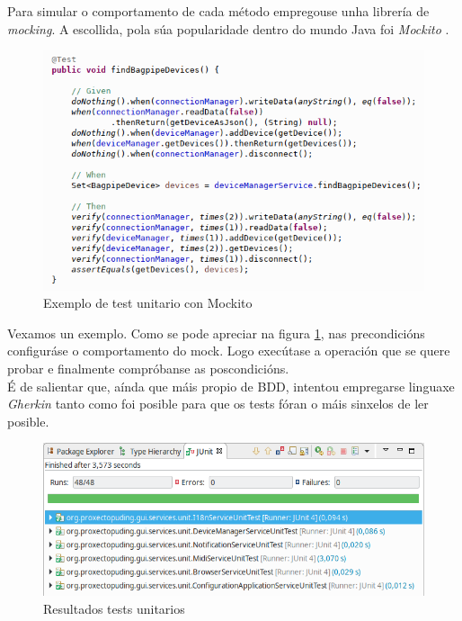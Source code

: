   Para simular o comportamento de cada método empregouse unha librería de
  \textit{mocking}. A escollida, pola súa popularidade dentro do mundo Java foi
  \textit{Mockito} \cite{Mockito}. \\
  
  \begin{figure}[htbp]
   \centering
   \includegraphics[scale=0.8,keepaspectratio=true]{./imagenes/test-mockito.png}
   \caption{Exemplo de test unitario con Mockito}
   \label{figura:TestMockito}
  \end{figure}
  
  Vexamos un exemplo. Como se pode apreciar na figura \ref{figura:TestMockito},
  nas precondicións configuráse o comportamento do mock. Logo execútase a
  operación que se quere probar e finalmente compróbanse as poscondicións. \\
  
  É de salientar que, aínda que máis propio de BDD, intentou empregarse linguaxe
  \textit{Gherkin} \cite{Gherkin} tanto como foi posible para que os tests fóran
  o máis sinxelos de ler posible. \\
  
  \begin{figure}[htbp]
   \centering
   \includegraphics[scale=0.8,keepaspectratio=true]{./imagenes/resultados-tests-unitarios.png}
   \caption{Resultados tests unitarios}
   \label{figura:ResultadosTestUnitarios}
  \end{figure}
  
